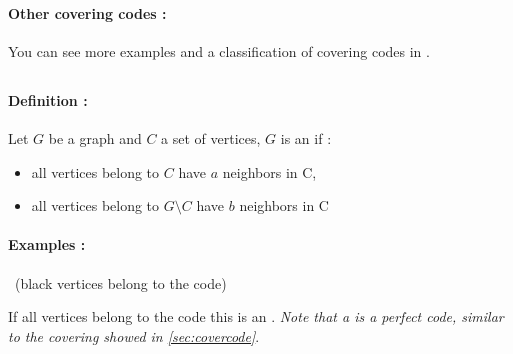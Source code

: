 \documentclass[10pt,a4paper,notitlepage]{article}
\begin{document}
\paragraph{Other covering codes :} You can see more examples and a classification of covering codes in \cite{CoveringClass}.


\subsection{\ABc}


\paragraph{Definition :}
\noindent Let $G$ be a graph and $C$ a set of vertices, $G$ is an \ABc if :
\begin{itemize}
    \item all vertices belong to $C$ have $a$ neighbors in C,
    \item all vertices belong to $G \setminus C$ have $b$ neighbors in C
\end{itemize}

\paragraph{Examples :}~(black vertices belong to the code) 
\begin{figure}[ht]
    \begin{minipage}[b]{0.5\linewidth}
    \end{minipage}
    \hspace{0.5cm}
    \begin{minipage}[b]{0.5\linewidth}
    \end{minipage}
\end{figure}

If all vertices belong to the code this is an .
\textit{Note that a  is a perfect code, similar to the covering showed in \ref{sec:covercode}}.


\subsection{\Sgs}
\end{document}
